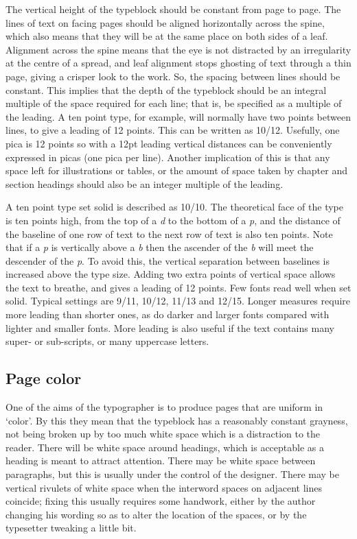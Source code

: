 \documentclass[10pt,letterpaper]{memoir}
\begin{document}
   The vertical height of the typeblock should be constant from page to
page. The lines of text on facing pages should be aligned
horizontally across the spine, which also means that they will be at
the same place on both sides of a leaf. Alignment across the spine
means that the eye is not distracted by an irregularity at the centre
of a spread, and leaf alignment stops ghosting of text through a thin page,
giving a crisper look to the work. 
So, the spacing between lines should
be constant. This implies that the depth of the typeblock should be an
integral multiple of the space required for each line; that is, be specified
as a multiple of the leading. A ten point type, for example, will normally
have two points between lines, to give a leading of 12 points. This can be
written as 10/12. Usefully, one pica is 12 points so with a 12pt leading
vertical distances can be conveniently expressed in picas 
(one pica per line). Another
implication of this is that any space left for illustrations or tables, or
the amount of space taken by chapter and section headings 
should also be
an integer multiple of the leading.

    A ten point type set solid is described as 10/10. The theoretical
face of the type is ten points high, from the top of a \emph{d} to the bottom
of a \emph{p}, and the distance of the baseline of one row of text to the
next row of text is also ten points. Note that if a \emph{p} is vertically
above a \emph{b} then the ascender of the \emph{b} will meet the descender
of the \emph{p}. To avoid this, the vertical separation between baselines 
is increased above the type size. Adding two extra points of vertical space
allows the text to breathe, and gives a leading of 12 points. Few fonts
read well when set solid. Typical settings are 9/11, 10/12, 11/13 and 12/15.
Longer measures require more leading than shorter ones, as do darker and larger
fonts compared with lighter and smaller fonts. More leading is also
useful if the text contains many super- or sub-scripts, 
or many uppercase 
letters.



\subsection{Page color}

    One of the aims of the typographer is to produce pages that are uniform
in `color'. 
By this they mean that the typeblock has a reasonably constant
grayness, not being broken up by too much white space which is a distraction
to the reader. There will be white space around headings, 
which is acceptable
as a heading is meant to attract attention. There may be white space between 
paragraphs, but this is usually under the control of the designer. There 
may be vertical rivulets of white space when the interword spaces on
adjacent lines coincide; fixing this usually requires some handwork, either
by the author changing his wording so as to alter the location of
the spaces, or by the typesetter tweaking a little bit. 
\end{document}
